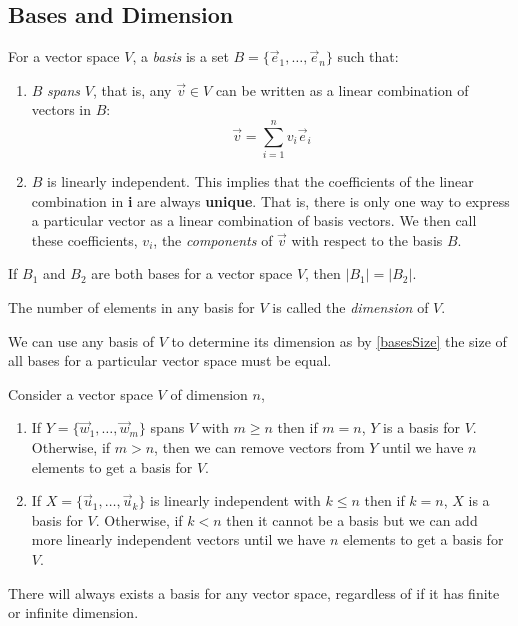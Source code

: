 \documentclass[../main.tex]{subfiles}
\begin{document}
\subsection{Bases and Dimension}
\begin{definition}[Basis]
  For a vector space $V$, a \textit{basis} is a set $B = \{\vec{e}_1, \ldots, \vec{e}_n\}$ such that:
  \begin{enumerate}
    \item $B$ \textit{spans} $V$, that is, any $\vec{v} \in V$ can be written as a linear combination of vectors in $B$:
      \[
        \vec{v} = \sum_{i=1}^{n} v_i \vec{e}_i
      \]
    \item $B$ is linearly independent.
      This implies that the coefficients of the linear combination in \textbf{i} are always \textbf{unique}.
      That is, there is only one way to express a particular vector as a linear combination of basis vectors.
      We then call these coefficients, $v_i$, the \textit{components} of $\vec{v}$ with respect to the basis $B$.
  \end{enumerate}
\end{definition}
\begin{theorem}
  If $B_1$ and $B_2$ are both bases for a vector space $V$, then $|B_1| = |B_2|$.
  \label{basesSize}
\end{theorem}
\begin{definition}[Dimension]
  The number of elements in any basis for $V$ is called the \textit{dimension} of $V$.
\end{definition}
\begin{remark}[Note]
  We can use any basis of $V$ to determine its dimension as by \cref{basesSize} the size of all bases for a particular vector space must be equal.
\end{remark}
\begin{proposition}
  Consider a vector space $V$ of dimension $n$,
  \begin{enumerate}
    \item If $Y = \{\vec{w}_1, \ldots, \vec{w}_m\}$ spans $V$ with $m \geq n$ then if $m = n$, $Y$ is a basis for $V$.
      Otherwise, if $m > n$, then we can remove vectors from $Y$ until we have $n$ elements to get a basis for $V$.
    \item If $X = \{\vec{u}_1, \ldots, \vec{u}_k\}$ is linearly independent with $k \leq n$ then if $k = n$, $X$ is a basis for $V$.
      Otherwise, if $k < n$ then it cannot be a basis but we can add more linearly independent vectors until we have $n$ elements to get a basis for $V$.
  \end{enumerate}
\end{proposition}
\begin{remark}
  There will always exists a basis for any vector space, regardless of if it has finite or infinite dimension.
\end{remark}
\end{document}
